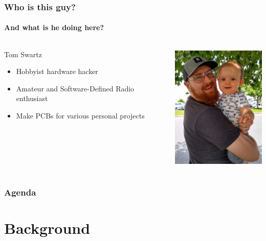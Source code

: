 \documentclass[]{beamer}
\begin{document}
\begin{frame}[plain]
    \frametitle{Who is this guy?}
    \framesubtitle{And what is he doing here?}
    \begin{columns}[T]
        \begin{column}[T]{5cm}
           {\huge Tom Swartz}
            \begin{itemize}%
                \item{Hobbyist hardware hacker}
                \item{Amateur and Software-Defined Radio enthusiast}
                \item{Make PCBs for various personal projects}
            \end{itemize}
        \end{column}
        \begin{column}[T]{5cm}
            \includegraphics[height=6cm]{images/me.jpg}
        \end{column}
    \end{columns}
\end{frame}

\begin{frame}[plain]
    \frametitle{Agenda}
    \tableofcontents
\end{frame}

\section[Background]{Background}
\end{document}
